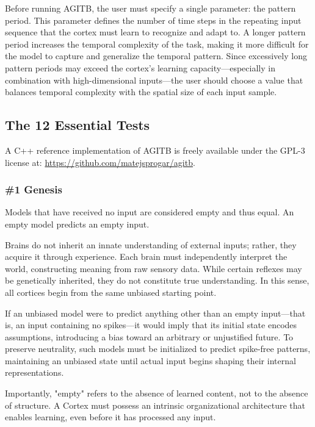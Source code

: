\documentclass{article}
\newenvironment{two_assertions}[2]
{
	\begin{tabular}{p{1.5cm}p{8.2cm}}
		\textbf{Assertion:} & #1 \\
		\textbf{Assertion:} & #2 \\
	}{
	\end{tabular}\\
}
\begin{document}
	Before running AGITB, the user must specify a single parameter: the pattern period. This parameter defines the number of time steps in the repeating input sequence that the cortex must learn to recognize and adapt to. A longer pattern period increases the temporal complexity of the task, making it more difficult for the model to capture and generalize the temporal pattern. Since excessively long pattern periods may exceed the cortex’s learning capacity—especially in combination with high-dimensional inputs—the user should choose a value that balances temporal complexity with the spatial size of each input sample.
	
	\subsection{The 12 Essential Tests}
	
	A C++ reference implementation of AGITB is freely available under the GPL-3 license at: \url{https://github.com/matejsprogar/agitb}.
	
	\subsubsection*{\#1 Genesis}
	\begin{two_assertions}
		{Models that have received no input are considered empty and thus equal.}
		{An empty model predicts an empty input.}
	\end{two_assertions}
	
	Brains do not inherit an innate understanding of external inputs; rather, they acquire it through experience. Each brain must independently interpret the world, constructing meaning from raw sensory data. While certain reflexes may be genetically inherited, they do not constitute true understanding. In this sense, all cortices begin from the same unbiased starting point.
	
	If an unbiased model were to predict anything other than an empty input—that is, an input containing no spikes—it would imply that its initial state encodes assumptions, introducing a bias toward an arbitrary or unjustified future. To preserve neutrality, such models must be initialized to predict spike-free patterns, maintaining an unbiased state until actual input begins shaping their internal representations.
	
	Importantly, "empty" refers to the absence of learned content, not to the absence of structure. A Cortex must possess an intrinsic organizational architecture that enables learning, even before it has processed any input.
	
\end{document}
